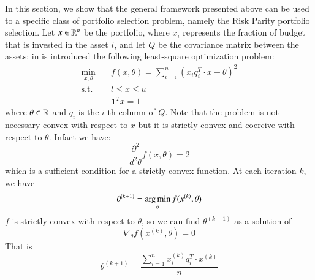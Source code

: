 In this section, we show that the general framework presented above can be used to a specific class of portfolio selection problem, namely the Risk Parity portfolio selection. Let $x \in \mathbb{R}^n$ be the portfolio, where $x_i$ represents the fraction of budget that is invested in the asset $i$, and let $Q$ be the covariance matrix between the assets; in \cite{bai} is introduced the following least-square optimization problem:
\begin{subequations}\label{eq:riskparity} 
\begin{align}
\min_{x,\theta} & \quad f(x,\theta) = \sum_{i=i}^n \left({x_i q_i^T \cdot x} - \theta \right)^2\\
\text{s.t.} & \quad l \leq x \leq u \\
& \quad \mathbf{1}^T x = 1 
\end{align}
\end{subequations}
where $\theta \in \mathbb{R}$ and $q_i$ is the $i$-th column of $Q$. Note that the problem is not necessary convex with respect to $x$ but it is strictly convex and coercive with respect to $\theta$. Infact we have:
\begin{equation}
\frac{\partial^2}{d^2\theta} f(x,\theta) = 2 
\end{equation}
which is a sufficient condition for a strictly convex function. At each iteration $k$, we have 
\begin{equation}
\theta^{(k+1)} = \operatorname*{arg\,min}_\theta f(x^{(k)},\theta)
\end{equation}
$f$ is strictly convex with respect to $\theta$, so we can find $\theta^{(k+1)}$ as a solution of
\begin{equation}
\nabla_\theta f(x^{(k)},\theta) = 0 
\end{equation}
That is
\begin{equation}
\theta^{(k+1)} = \frac{\sum_{i=1}^n x_i^{(k)} q_i^T \cdot x^{(k)}}{n}
\end{equation}